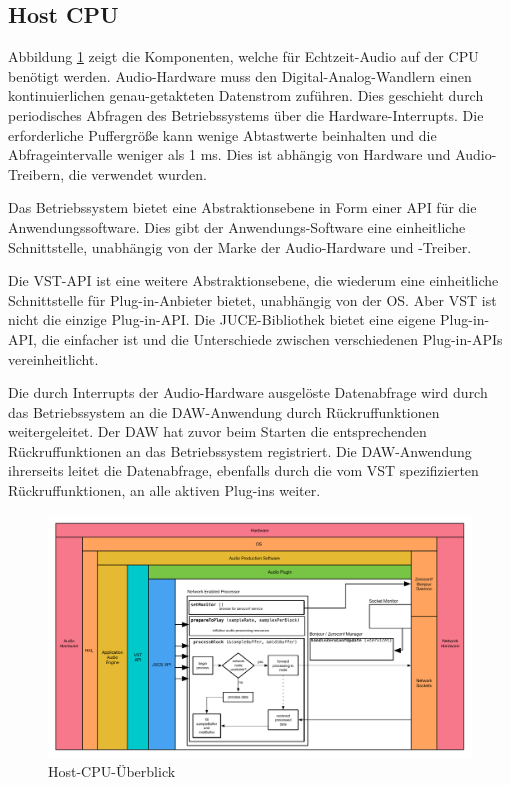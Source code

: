 \subsection{Host CPU}

Abbildung \ref{fig:arch_02} zeigt die Komponenten, welche für Echtzeit-Audio auf der CPU benötigt werden. Audio-Hardware muss den Digital-Analog-Wandlern einen kontinuierlichen genau-getakteten Datenstrom zuführen. Dies geschieht durch periodisches Abfragen des Betriebssystems über die Hardware-Interrupts. Die erforderliche  Puffergröße kann wenige Abtastwerte beinhalten und die Abfrageintervalle weniger als 1 ms. Dies ist abhängig von Hardware und Audio-Treibern, die verwendet wurden.

Das Betriebssystem bietet eine Abstraktionsebene in Form einer API für die Anwendungssoftware. Dies gibt der Anwendungs-Software eine einheitliche Schnittstelle, unabhängig von der Marke der Audio-Hardware und -Treiber.

Die VST-API ist eine weitere Abstraktionsebene, die wiederum eine einheitliche Schnittstelle für Plug-in-Anbieter bietet, unabhängig von der OS. Aber VST ist nicht die einzige Plug-in-API. Die JUCE-Bibliothek bietet eine eigene Plug-in-API, die einfacher ist und die Unterschiede zwischen verschiedenen Plug-in-APIs vereinheitlicht.

Die durch Interrupts der Audio-Hardware ausgelöste Datenabfrage wird durch das Betriebssystem an die DAW-Anwendung durch Rückruffunktionen weitergeleitet. Der DAW hat zuvor beim Starten die entsprechenden Rückruffunktionen an das Betriebssystem registriert. Die DAW-Anwendung ihrerseits leitet die Datenabfrage, ebenfalls durch die vom VST spezifizierten Rückruffunktionen, an alle aktiven Plug-ins weiter.

\begin{figure}[H]
    \centering
    \includegraphics[width=\textwidth]{assets/architecture_02.pdf}
    \caption{Host-CPU-Überblick}
    \label{fig:arch_02}
\end{figure}

